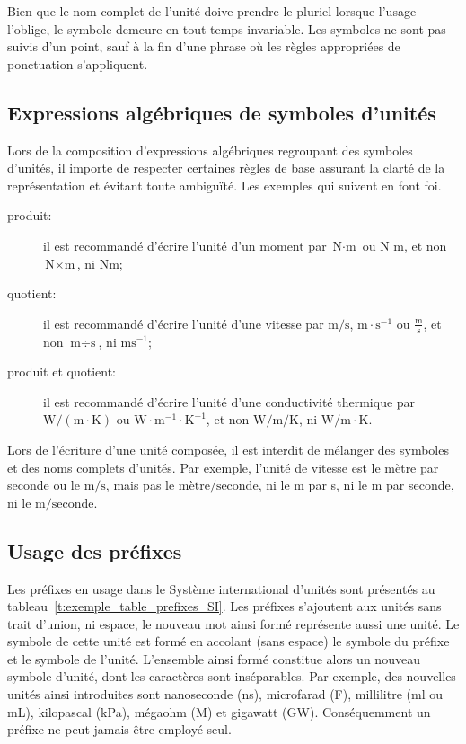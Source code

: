 Bien que le nom complet de l'unité doive prendre le pluriel lorsque l'usage l'oblige, le symbole demeure en tout temps invariable. Les symboles ne sont pas suivis d'un point, sauf à la fin d'une phrase où les règles appropriées de ponctuation s'appliquent.


\subsection{Expressions algébriques de symboles d'unités}
\label{s:regles_expressions_symboles}

Lors de la composition d'expressions algébriques regroupant des symboles d'unités, il importe de respecter certaines règles de base assurant la clarté de la représentation et évitant toute ambiguïté. Les exemples qui suivent en font foi.
\begin{description}

  \item[produit:] il est recommandé d'écrire l'unité d'un moment par $\text{N} \cdot \text{m}$ ou $\text{N~m}$, et non $\text{N} \times \text{m}$, ni $\text{N} \text{m}$;

  \item[quotient:] il est recommandé d'écrire l'unité d'une vitesse par $\text{m} / \text{s}$, $\text{m} \cdot \text{s}^{-1}$ ou $\displaystyle\frac{\text{m}}{\text{s}}$, et non $\text{m} \div \text{s}$, ni $\text{ms}^{-1}$;

  \item[produit et quotient:] il est recommandé d'écrire l'unité d'une conductivité thermique par $\text{W} / (\text{m} \cdot \text{K})$ ou $\text{W} \cdot \text{m}^{-1} \cdot \text{K}^{-1}$, et non $\text{W} / \text{m} / \text{K}$, ni $\text{W} / \text{m} \cdot \text{K}$.

\end{description}

Lors de l'écriture d'une unité composée, il est interdit de mélanger des symboles et des noms complets d'unités. Par exemple, l'unité de vitesse est le mètre par seconde ou le $\text{m} / \text{s}$, mais pas le $\text{mètre} / \text{seconde}$, ni le m par s, ni le m par seconde, ni le $\text{m} / \text{seconde}$.


\subsection{Usage des préfixes}
\label{s:regles_prefixes}

Les préfixes en usage dans le Système international d'unités sont présentés au tableau~\ref{t:exemple_table_prefixes_SI}. Les préfixes s'ajoutent aux unités sans trait d'union, ni espace, le nouveau mot ainsi formé représente aussi une unité. Le symbole de cette unité est formé en accolant (sans espace) le symbole du préfixe et le symbole de l'unité. L'ensemble ainsi formé constitue alors un nouveau symbole d'unité, dont les caractères sont inséparables. Par exemple, des nouvelles unités ainsi introduites sont nanoseconde (ns), microfarad (\textmu F), millilitre (ml ou mL), kilopascal (kPa), mégaohm (M\textohm) et gigawatt (GW). Conséquemment un préfixe ne peut jamais être employé seul.

